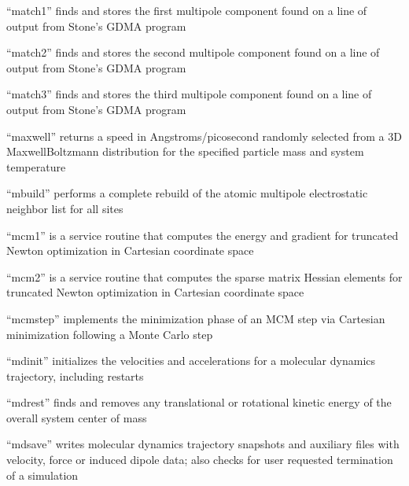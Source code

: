 \documentclass[letterpaper,11pt,english]{sphinxmanual}
\begin{document}

“match1” finds and stores the first multipole component found
on a line of output from Stone’s GDMA program


“match2” finds and stores the second multipole component found
on a line of output from Stone’s GDMA program


“match3” finds and stores the third multipole component found
on a line of output from Stone’s GDMA program


“maxwell” returns a speed in Angstroms/picosecond randomly
selected from a 3\sphinxhyphen{}D Maxwell\sphinxhyphen{}Boltzmann distribution for the
specified particle mass and system temperature


“mbuild” performs a complete rebuild of the atomic multipole
electrostatic neighbor list for all sites


“mcm1” is a service routine that computes the energy and
gradient for truncated Newton optimization in Cartesian
coordinate space


“mcm2” is a service routine that computes the sparse matrix
Hessian elements for truncated Newton optimization in Cartesian
coordinate space


“mcmstep” implements the minimization phase of an MCM step
via Cartesian minimization following a Monte Carlo step


“mdinit” initializes the velocities and accelerations
for a molecular dynamics trajectory, including restarts


“mdrest” finds and removes any translational or rotational
kinetic energy of the overall system center of mass


“mdsave” writes molecular dynamics trajectory snapshots and
auxiliary files with velocity, force or induced dipole data;
also checks for user requested termination of a simulation
\end{document}

